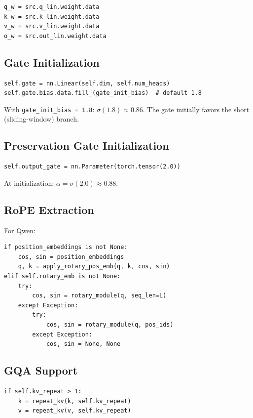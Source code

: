 \begin{lstlisting}
q_w = src.q_lin.weight.data
k_w = src.k_lin.weight.data
v_w = src.v_lin.weight.data
o_w = src.out_lin.weight.data
\end{lstlisting}

\subsection{Gate Initialization}

\begin{lstlisting}
self.gate = nn.Linear(self.dim, self.num_heads)
self.gate.bias.data.fill_(gate_init_bias)  # default 1.8
\end{lstlisting}

With \texttt{gate\_init\_bias = 1.8}: $\sigma(1.8) \approx 0.86$. The gate initially 
favors the short (sliding-window) branch.

\subsection{Preservation Gate Initialization}

\begin{lstlisting}
self.output_gate = nn.Parameter(torch.tensor(2.0))
\end{lstlisting}

At initialization: $\alpha = \sigma(2.0) \approx 0.88$.

\subsection{RoPE Extraction}

For Qwen:

\begin{lstlisting}
if position_embeddings is not None:
    cos, sin = position_embeddings
    q, k = apply_rotary_pos_emb(q, k, cos, sin)
elif self.rotary_emb is not None:
    try:
        cos, sin = rotary_module(q, seq_len=L)
    except Exception:
        try:
            cos, sin = rotary_module(q, pos_ids)
        except Exception:
            cos, sin = None, None
\end{lstlisting}

\subsection{GQA Support}

\begin{lstlisting}
if self.kv_repeat > 1:
    k = repeat_kv(k, self.kv_repeat)
    v = repeat_kv(v, self.kv_repeat)
\end{lstlisting}

